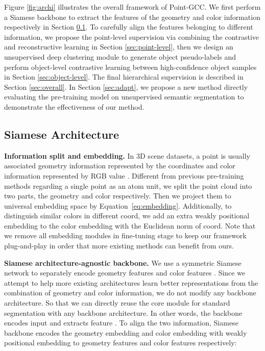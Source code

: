 \documentclass{article}
\begin{document}
Figure \ref{fig:archi} illustrates the overall framework of Point-GCC.
We first perform a Siamese backbone to extract the features of the geometry and color information respectively in Section \ref{sec:siamese}. To carefully align the features belonging to different information, we propose the point-level supervision via combining the contrastive and reconstructive learning in Section \ref{sec:point-level}, then we design an unsupervised deep clustering module to generate object pseudo-labels and perform object-level contrastive learning between high-confidence object samples in Section \ref{sec:object-level}. The final hierarchical supervision is described in Section \ref{sec:overall}.
In Section \ref{sec:adapt}, we propose a new method directly evaluating the pre-training model on unsupervised semantic segmentation to demonstrate the effectiveness of our method.

\subsection{Siamese Architecture}
\label{sec:siamese}
\vspace{-0.25cm}
\textbf{Information split and embedding.} In 3D scene datasets, a point  is usually associated geometry information represented by the coordinates  and color information represented by RGB value . Different from previous pre-training methods regarding a single point as an atom unit, we split the point cloud into two parts, the geometry and color respectively. Then we project them to universal embedding space  by Equation~\ref{eq:embedding}. Additionally, to distinguish similar colors in different coord, we add an extra weakly positional embedding  to the color embedding with the Euclidean norm of coord.
Note that we remove all embedding modules in fine-tuning stage to keep our framework plug-and-play in order that more existing methods can benefit from ours.

\textbf{Siamese architecture-agnostic backbone.} We use a symmetric Siamese network  to separately encode geometry features  and color features . Since we attempt to help more existing architectures learn better representations from the combination of geometry and color information, we do not modify any backbone architecture. So that we can directly reuse the core module for standard segmentation with any backbone architecture. In other words, the backbone encodes input  and extracts feature . To align the two information, Siamese backbone  encodes the geometry embedding  and color embedding  with weakly positional embedding  to geometry features  and color features  respectively:
\end{document}
